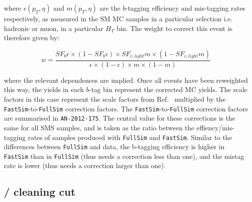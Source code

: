 where $\epsilon(p_{T}, \eta)$ and $m(p_{T}, \eta)$ are the $b$-tagging
efficiency and mis-tagging rates respectively, as measured in the SM
MC samples in a particular selection i.e. hadronic or muon, in a
particular $H_{T}$ bin. The weight to correct this event is therefore
given by:

\begin{equation}
  \label{equ:blah1}
  w=\frac{SF_{b}\epsilon\times(1-SF_{b}\epsilon)\times SF_{c,light}m
    \times (1-SF_{c,light}m)}{\epsilon\times(1-\epsilon)\times m \times
    (1-m)} 
\end{equation}

where the relevant dependences are implied. Once all events have been
reweighted this way, the yields in each $b$-tag bin represent the
corrected MC yields. The scale factors in this case represent the
scale factors from Ref.~\cite{btagpogtwiki} multiplied by the
\verb!FastSim!-to-\verb!FullSim! correction factors. The
\verb!FastSim!-to-\verb!FullSim! correction factors are summarised in
\texttt{AN-2012-175}. The central value for these corrections is the
same for all SMS samples, and is taken as the ratio between the
effiency/mis-tagging rates of \ttbar samples produced with
\verb!FullSim! and \verb!FastSim!. Similar to the differences between
\verb!FullSim! and data, the b-tagging efficiency is higher in
\verb!FastSim! than in \verb!FullSim! (thus needs a correction less
than one), and the mistag rate is lower (thus needs a correction
larger than one).

\subsection{\texorpdfstring{\mht/\met}{MHT/MET} cleaning cut\label{sec:sms-syst-mht-met}}


